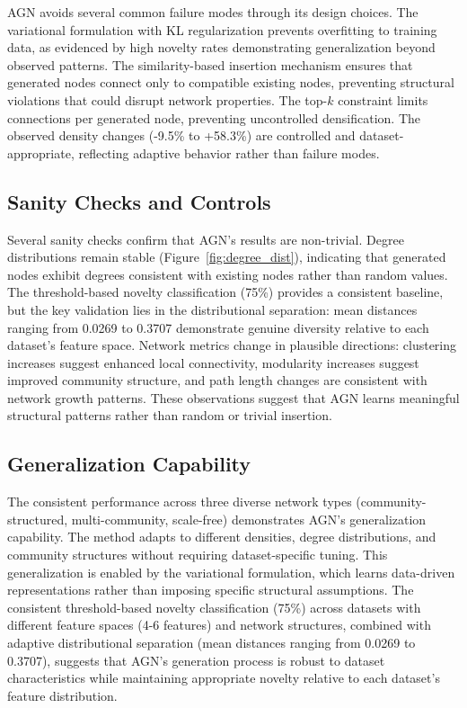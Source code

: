 \documentclass[12pt]{article}
\begin{document}
AGN avoids several common failure modes through its design choices. The variational formulation with KL regularization prevents overfitting to training data, as evidenced by high novelty rates demonstrating generalization beyond observed patterns. The similarity-based insertion mechanism ensures that generated nodes connect only to compatible existing nodes, preventing structural violations that could disrupt network properties. The top-$k$ constraint limits connections per generated node, preventing uncontrolled densification. The observed density changes (-9.5\% to +58.3\%) are controlled and dataset-appropriate, reflecting adaptive behavior rather than failure modes.

\subsection{Sanity Checks and Controls}

Several sanity checks confirm that AGN's results are non-trivial. Degree distributions remain stable (Figure~\ref{fig:degree_dist}), indicating that generated nodes exhibit degrees consistent with existing nodes rather than random values. The threshold-based novelty classification (75\%) provides a consistent baseline, but the key validation lies in the distributional separation: mean distances ranging from 0.0269 to 0.3707 demonstrate genuine diversity relative to each dataset's feature space. Network metrics change in plausible directions: clustering increases suggest enhanced local connectivity, modularity increases suggest improved community structure, and path length changes are consistent with network growth patterns. These observations suggest that AGN learns meaningful structural patterns rather than random or trivial insertion.

\subsection{Generalization Capability}

The consistent performance across three diverse network types (community-structured, multi-community, scale-free) demonstrates AGN's generalization capability. The method adapts to different densities, degree distributions, and community structures without requiring dataset-specific tuning. This generalization is enabled by the variational formulation, which learns data-driven representations rather than imposing specific structural assumptions. The consistent threshold-based novelty classification (75\%) across datasets with different feature spaces (4-6 features) and network structures, combined with adaptive distributional separation (mean distances ranging from 0.0269 to 0.3707), suggests that AGN's generation process is robust to dataset characteristics while maintaining appropriate novelty relative to each dataset's feature distribution.
\end{document}
